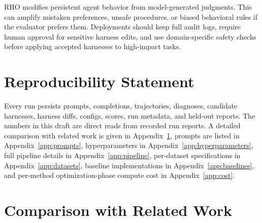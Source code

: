 \documentclass{llmxive}
\providecommand{\method}{\textsc{RHO}}
\providecommand{\nolinenumbers}{}
\begin{document}
\method{} modifies persistent agent behavior from model-generated judgments.
This can amplify mistaken preferences, unsafe procedures, or biased behavioral rules if the evaluator prefers them.
Deployments should keep full audit logs, require human approval for sensitive harness edits, and use domain-specific safety checks before applying accepted harnesses to high-impact tasks.

\section*{Reproducibility Statement}

Every run persists prompts, completions, trajectories, diagnoses, candidate harnesses, harness diffs, configs, scores, run metadata, and held-out reports.
The numbers in this draft are direct reads from recorded run reports.
A detailed comparison with related work is given in Appendix~\ref{app:positioning}, prompts are listed in Appendix~\ref{app:prompts}, hyperparameters in Appendix~\ref{app:hyperparameters}, full pipeline details in Appendix~\ref{app:pipeline}, per-dataset specifications in Appendix~\ref{app:datasets}, baseline implementations in Appendix~\ref{app:baselines}, and per-method optimization-phase compute cost in Appendix~\ref{app:cost}.




\appendix


\nolinenumbers   %
\section{Comparison with Related Work}\label{app:positioning}
\end{document}
